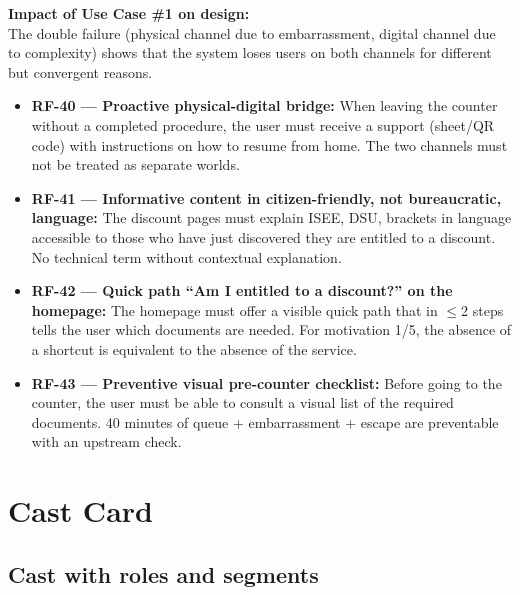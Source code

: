 ﻿\documentclass[11pt,a4paper]{article}
\begin{document}
\vspace{0.3cm}

\begin{tcolorbox}[base]
    {\small
    \textbf{Impact of Use Case \#1 on design:} \\[4pt]
    The double failure (physical channel due to embarrassment, digital channel due to complexity) shows that the system loses users on both channels for different but convergent reasons.

    \begin{itemize}[leftmargin=*]
        \item \textbf{RF-40 --- Proactive physical-digital bridge:} When leaving the counter without a completed procedure, the user must receive a support (sheet/QR code) with instructions on how to resume from home. The two channels must not be treated as separate worlds.

        \item \textbf{RF-41 --- Informative content in citizen-friendly, not bureaucratic, language:} The discount pages must explain ISEE, DSU, brackets in language accessible to those who have just discovered they are entitled to a discount. No technical term without contextual explanation.

        \item \textbf{RF-42 --- Quick path ``Am I entitled to a discount?'' on the homepage:} The homepage must offer a visible quick path that in $\leq$2 steps tells the user which documents are needed. For motivation 1/5, the absence of a shortcut is equivalent to the absence of the service.

        \item \textbf{RF-43 --- Preventive visual pre-counter checklist:} Before going to the counter, the user must be able to consult a visual list of the required documents. 40 minutes of queue + embarrassment + escape are preventable with an upstream check.
    \end{itemize}
    }
\end{tcolorbox}


\newpage
\section{Cast Card}

\subsection{Cast with roles and segments}
\end{document}
